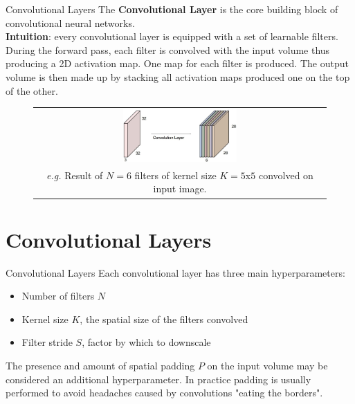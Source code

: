 \documentclass[aspectratio=169]{beamer}
\begin{document}
\begin{frame}{Convolutional Layers}
The \textbf{Convolutional Layer} is the core building block of convolutional neural networks.\\
\vspace{0.2cm}
\textbf{Intuition}: every convolutional layer is equipped with a set of learnable filters. During the forward pass, each filter is convolved with the input volume thus producing a 2D activation map. One map for each filter is produced. The output volume is then made up by stacking all activation maps produced one on the top of the other. 	
\begin{figure}
\begin{tabular}{c}
\includegraphics[width=0.4\textwidth]{img/cnn/activation_maps.jpg}\\
\small{\emph{e.g.} Result of $N=6$ filters of kernel size $K=5$x$5$ convolved on input image.}
\end{tabular}
\end{figure}
\end{frame}



\section*{Convolutional Layers}


\begin{frame}{Convolutional Layers}
Each convolutional layer has three main hyperparameters:
\begin{itemize}
\item Number of filters $N$
\item Kernel size $K$, the spatial size of the filters convolved
\item Filter stride $S$, factor by which to downscale
\end{itemize}
The presence and amount of spatial padding $P$ on the input volume may be considered an additional hyperparameter. In practice padding is usually performed to avoid headaches caused by convolutions "eating the borders".
\end{frame}
\end{document}

